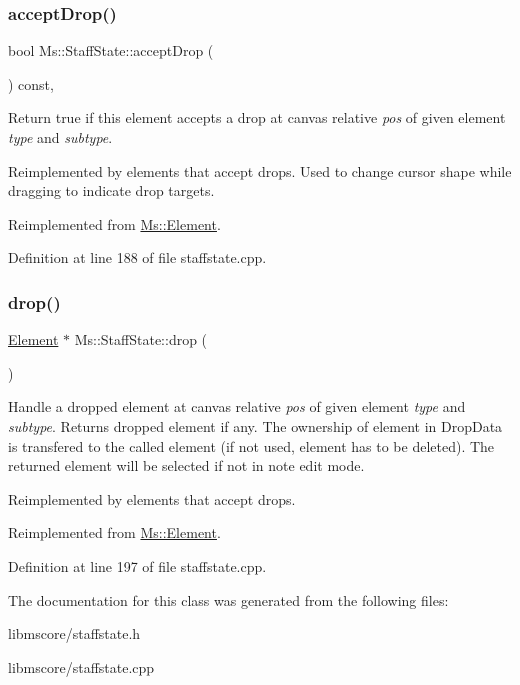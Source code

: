 \subsubsection{\texorpdfstring{accept\+Drop()}{acceptDrop()}}
{\footnotesize\ttfamily bool Ms\+::\+Staff\+State\+::accept\+Drop (\begin{DoxyParamCaption}\item[{\hyperlink{class_ms_1_1_edit_data}{Edit\+Data} \&}]{ }\end{DoxyParamCaption}) const\hspace{0.3cm}{\ttfamily [override]}, {\ttfamily [virtual]}}

Return true if this element accepts a drop at canvas relative {\itshape pos} of given element {\itshape type} and {\itshape subtype}.

Reimplemented by elements that accept drops. Used to change cursor shape while dragging to indicate drop targets. 

Reimplemented from \hyperlink{class_ms_1_1_element_a35614445f0bc2212cbcc75c3f5810543}{Ms\+::\+Element}.



Definition at line 188 of file staffstate.\+cpp.

\mbox{\label{class_ms_1_1_staff_state_a053476091ca14ed47e7e79e9bd1202cf}} 
\subsubsection{\texorpdfstring{drop()}{drop()}}
{\footnotesize\ttfamily \hyperlink{class_ms_1_1_element}{Element} $\ast$ Ms\+::\+Staff\+State\+::drop (\begin{DoxyParamCaption}\item[{\hyperlink{class_ms_1_1_edit_data}{Edit\+Data} \&}]{ }\end{DoxyParamCaption})\hspace{0.3cm}{\ttfamily [virtual]}}

Handle a dropped element at canvas relative {\itshape pos} of given element {\itshape type} and {\itshape subtype}. Returns dropped element if any. The ownership of element in Drop\+Data is transfered to the called element (if not used, element has to be deleted). The returned element will be selected if not in note edit mode.

Reimplemented by elements that accept drops. 

Reimplemented from \hyperlink{class_ms_1_1_element_a0ca69a9fb48e7b9fb481aacaf3860032}{Ms\+::\+Element}.



Definition at line 197 of file staffstate.\+cpp.



The documentation for this class was generated from the following files\+:\begin{DoxyCompactItemize}
\item 
libmscore/staffstate.\+h\item 
libmscore/staffstate.\+cpp\end{DoxyCompactItemize}
